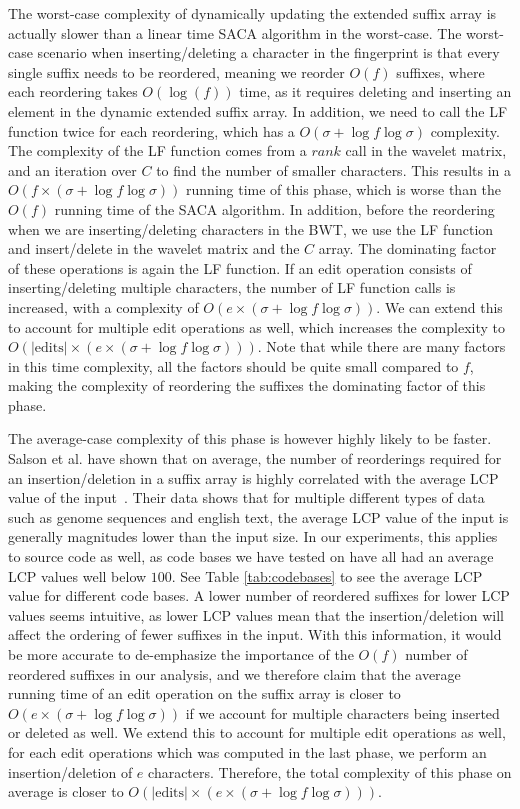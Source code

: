 The worst-case complexity of dynamically updating the extended suffix array is actually
slower than a linear time SACA algorithm in the worst-case. The worst-case scenario when
inserting/deleting a character in the fingerprint is that every single suffix needs to be
reordered, meaning we reorder $O(f)$ suffixes, where each reordering takes $O(\log(f))$
time, as it requires deleting and inserting an element in the dynamic extended suffix
array. In addition, we need to call the LF function twice for each reordering, which has a
$O(\sigma + \log f \log\sigma)$ complexity. The complexity of the LF function comes from a
$rank$ call in the wavelet matrix, and an iteration over $C$ to find the number of smaller
characters. This results in a $O(f \times (\sigma + \log f \log\sigma))$ running time of
this phase, which is worse than the $O(f)$ running time of the SACA algorithm. In
addition, before the reordering when we are inserting/deleting characters in the BWT, we
use the LF function and insert/delete in the wavelet matrix and the $C$ array. The
dominating factor of these operations is again the LF function. If an edit operation
consists of inserting/deleting multiple characters, the number of LF function calls is
increased, with a complexity of $O(e \times (\sigma + \log f \log\sigma))$. We can extend
this to account for multiple edit operations as well, which increases the complexity to
$O(\vert\text{edits}\vert \times (e \times (\sigma + \log f \log\sigma)))$. Note that while
there are many factors in this time complexity, all the factors should be quite small
compared to $f$, making the complexity of reordering the suffixes the dominating factor of
this phase.

The average-case complexity of this phase is however highly likely to be faster. Salson et
al. have shown that on average, the number of reorderings required for an
insertion/deletion in a suffix array is highly correlated with the average LCP value of
the input~\cite{DynamicExtendedSuffixArraysReorderings}. Their data shows that for
multiple different types of data such as genome sequences and english text, the average
LCP value of the input is generally magnitudes lower than the input size. In our
experiments, this applies to source code as well, as code bases we have tested on have all
had an average LCP values well below $100$. See Table \ref{tab:codebases} to see the
average LCP value for different code bases. A lower number of reordered suffixes for lower
LCP values seems intuitive, as lower LCP values mean that the insertion/deletion will
affect the ordering of fewer suffixes in the input. With this information, it would be
more accurate to de-emphasize the importance of the $O(f)$ number of reordered suffixes in
our analysis, and we therefore claim that the average running time of an edit operation on
the suffix array is closer to $O(e \times (\sigma + \log f \log\sigma))$ if we account for
multiple characters being inserted or deleted as well. We extend this to account for
multiple edit operations as well, for each edit operations which was computed in the last
phase, we perform an insertion/deletion of $e$ characters. Therefore, the total complexity
of this phase on average is closer to $O(\vert\text{edits}\vert \times (e \times (\sigma +
\log f \log\sigma)))$.

